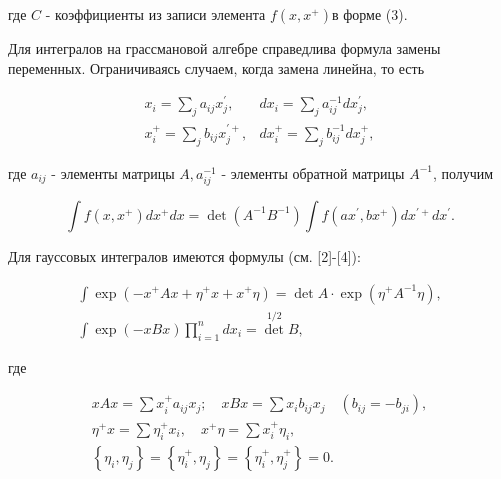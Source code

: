 \documentclass[10pt]{article}
\begin{document}
где $C$ - коэффициенты из записи элемента $f\left(x, x^{+}\right)$в форме (3).



Для интегралов на грассмановой алгебре справедлива формула замены переменных. Ограничиваясь случаем, когда замена линейна, то есть



\[

\begin{aligned}

x_{i}=\sum_{j} a_{i j} x_{j}^{\prime}, & d x_{i}=\sum_{j} a_{i j}^{-1} d x_{j}^{\prime}, \\

x_{i}^{+}=\sum_{j} b_{i j} x_{j}^{\prime+}, & d x_{i}^{+}=\sum_{j} b_{i j}^{-1} d x_{j}^{+},

\end{aligned}

\]



где $a_{i j}$ - элементы матрицы $A, a_{i j}^{-1}$ - элементы обратной матрицы $A^{-1}$, получим



\[

\int f\left(x, x^{+}\right) d x^{+} d x=\operatorname{det}\left(A^{-1} B^{-1}\right) \int f\left(a x^{\prime}, b x^{+}\right) d x^{\prime+} d x^{\prime} .

\]



Для гауссовых интегралов имеются формулы (см. [2]-[4]):



\[

\begin{gathered}

\int \exp \left(-x^{+} A x+\eta^{+} x+x^{+} \eta\right)=\operatorname{det} A \cdot \exp \left(\eta^{+} A^{-1} \eta\right), \\

\int \exp (-x B x) \prod_{i=1}^{n} d x_{i}=\operatorname{det}^{1 / 2} B,

\end{gathered}

\]



где



\[

\begin{gathered}

x A x=\sum x_{i}^{+} a_{i j} x_{j} ; \quad x B x=\sum x_{i} b_{i j} x_{j} \quad\left(b_{i j}=-b_{j i}\right), \\

\eta^{+} x=\sum \eta_{i}^{+} x_{i}, \quad x^{+} \eta=\sum x_{i}^{+} \eta_{i}, \\

\left\{\eta_{i}, \eta_{j}\right\}=\left\{\eta_{i}^{+}, \eta_{j}\right\}=\left\{\eta_{i}^{+}, \eta_{j}^{+}\right\}=0 .

\end{gathered}

\]
\end{document}
